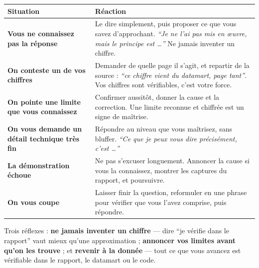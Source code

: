 \documentclass[a4paper,11pt]{article}
\begin{document}
\noindent\begin{tabularx}{\textwidth}{|>{\bfseries}L{5cm}|X|}
\hline
\textmd{\textbf{Situation}} & \textbf{Réaction}\\
\hline
Vous ne connaissez pas la réponse & Le dire simplement, puis proposer ce que vous savez d'approchant. \emph{\enquote{Je ne l'ai pas mis en \oe uvre, mais le principe est \dots}} Ne jamais inventer un chiffre.\\
\hline
On conteste un de vos chiffres & Demander de quelle page il s'agit, et repartir de la source : \emph{\enquote{ce chiffre vient du datamart, page tant}}. Vos chiffres sont vérifiables, c'est votre force.\\
\hline
On pointe une limite que vous connaissez & Confirmer aussitôt, donner la cause et la correction. Une limite reconnue et chiffrée est un signe de maîtrise.\\
\hline
On vous demande un détail technique très fin & Répondre au niveau que vous maîtrisez, sans bluffer. \emph{\enquote{Ce que je peux vous dire précisément, c'est \dots}}\\
\hline
La démonstration échoue & Ne pas s'excuser longuement. Annoncer la cause si vous la connaissez, montrer les captures du rapport, et poursuivre.\\
\hline
On vous coupe & Laisser finir la question, reformuler en une phrase pour vérifier que vous l'avez comprise, puis répondre.\\
\hline
\end{tabularx}

\vspace{1em}
\begin{coeur}
Trois réflexes : \textbf{ne jamais inventer un chiffre} --- dire \enquote{je
vérifie dans le rapport} vaut mieux qu'une approximation ; \textbf{annoncer vos
limites avant qu'on les trouve} ; et \textbf{revenir à la donnée} --- tout ce
que vous avancez est vérifiable dans le rapport, le datamart ou le code.
\end{coeur}
\end{document}
